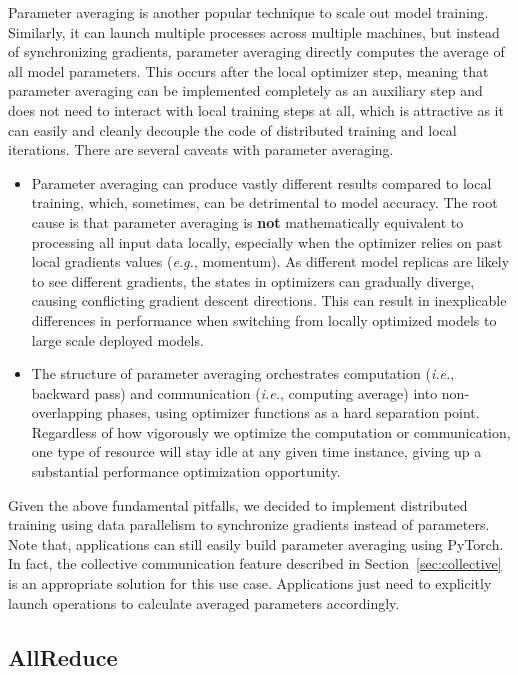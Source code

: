 Parameter averaging is another popular technique to scale out model training. Similarly, it can launch multiple processes across multiple machines, but instead of synchronizing gradients, parameter averaging directly computes the average of all model parameters. This occurs after the local optimizer step, meaning that parameter averaging can be implemented completely as an auxiliary step and does not need to interact with local training steps at all, which is attractive as it can easily and cleanly decouple the code of distributed training and local iterations. There are several caveats with parameter averaging. 

\begin{itemize}
    \item Parameter averaging can produce vastly different results compared to local training, which, sometimes, can be detrimental to model accuracy. The root cause is that parameter averaging is \textbf{not} mathematically equivalent to processing all input data locally, especially when the optimizer relies on past local gradients values (\emph{e.g.}, momentum). As different model replicas are likely to see different gradients, the states in optimizers can gradually diverge, causing conflicting gradient descent directions. This can result in inexplicable differences in performance when switching from locally optimized models to large scale deployed models. 
    \item The structure of parameter averaging orchestrates computation (\emph{i.e.}, backward pass) and communication (\emph{i.e.}, computing average) into non-overlapping phases, using optimizer  functions as a hard separation point. Regardless of how vigorously we optimize the computation or communication, one type of resource will stay idle at any given time instance, giving up a substantial performance optimization opportunity. 
\end{itemize}

Given the above fundamental pitfalls, we decided to implement distributed training using data parallelism to synchronize gradients instead of parameters. Note that, applications can still easily build parameter averaging using PyTorch. In fact, the collective communication feature described in Section~\ref{sec:collective} is an appropriate solution for this use case. Applications just need to explicitly launch  operations to calculate averaged parameters accordingly. 


\subsection{AllReduce}


